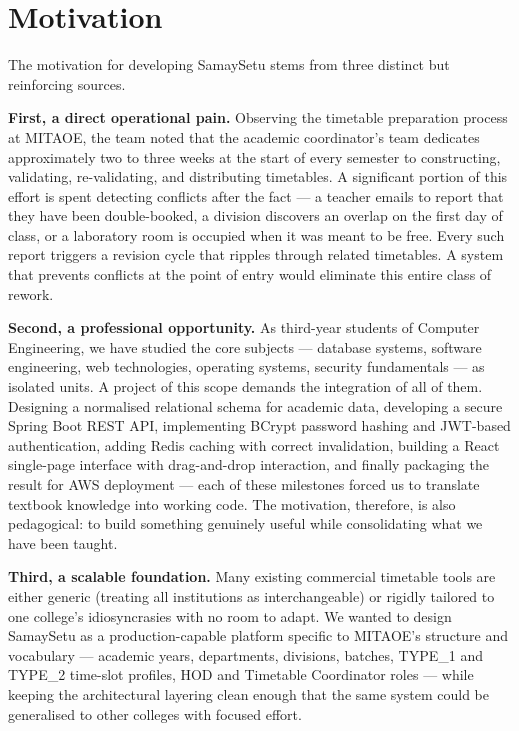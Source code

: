 \section{Motivation}

The motivation for developing SamaySetu stems from three distinct but reinforcing sources.

\textbf{First, a direct operational pain.} Observing the timetable preparation process at MITAOE, the team noted that the academic coordinator's team dedicates approximately two to three weeks at the start of every semester to constructing, validating, re-validating, and distributing timetables. A significant portion of this effort is spent detecting conflicts after the fact --- a teacher emails to report that they have been double-booked, a division discovers an overlap on the first day of class, or a laboratory room is occupied when it was meant to be free. Every such report triggers a revision cycle that ripples through related timetables. A system that prevents conflicts at the point of entry would eliminate this entire class of rework.

\textbf{Second, a professional opportunity.} As third-year students of Computer Engineering, we have studied the core subjects --- database systems, software engineering, web technologies, operating systems, security fundamentals --- as isolated units. A project of this scope demands the integration of all of them. Designing a normalised relational schema for academic data, developing a secure Spring Boot REST API, implementing BCrypt password hashing and JWT-based authentication, adding Redis caching with correct invalidation, building a React single-page interface with drag-and-drop interaction, and finally packaging the result for AWS deployment --- each of these milestones forced us to translate textbook knowledge into working code. The motivation, therefore, is also pedagogical: to build something genuinely useful while consolidating what we have been taught.

\textbf{Third, a scalable foundation.} Many existing commercial timetable tools are either generic (treating all institutions as interchangeable) or rigidly tailored to one college's idiosyncrasies with no room to adapt. We wanted to design SamaySetu as a production-capable platform specific to MITAOE's structure and vocabulary --- academic years, departments, divisions, batches, TYPE\_1 and TYPE\_2 time-slot profiles, HOD and Timetable Coordinator roles --- while keeping the architectural layering clean enough that the same system could be generalised to other colleges with focused effort.

